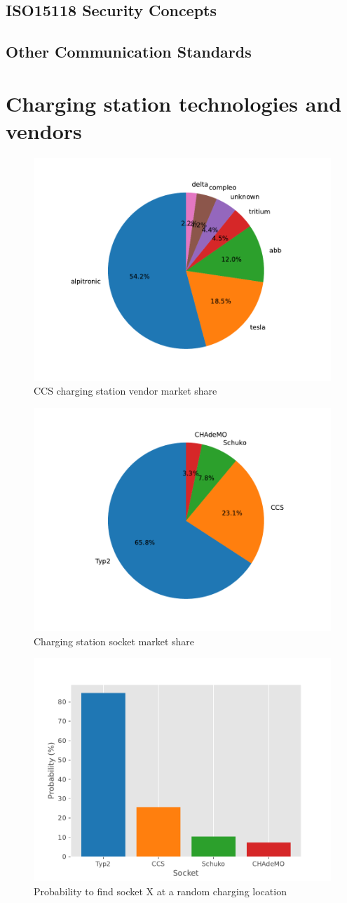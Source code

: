 \documentclass[conference,flushend]{iaria} %
\begin{document}
\subsection{ISO15118 Security Concepts}
\subsection{Other Communication Standards}

\section{Charging station technologies and vendors}
\begin{figure}[ht]
    \centering
    \includegraphics[width=.489\textwidth]{graphs/market_analysis.pdf}
    \caption{CCS charging station vendor market share}
    \label{fig:marketshare}
\end{figure}

\begin{figure}[ht]
    \centering
    \includegraphics[width=.489\textwidth]{graphs/socket_analysis.pdf}
    \caption{Charging station socket market share}
    \label{fig:sockets}
\end{figure}

\begin{figure}[ht]
    \centering
    \includegraphics[width=.489\textwidth]{graphs/socket_probability.pdf}
    \caption{Probability to find socket X at a random charging location}
    \label{fig:socketsprob}
\end{figure}
\end{document}
